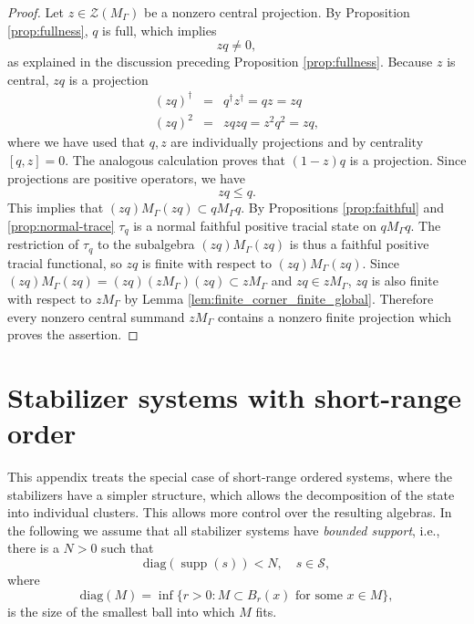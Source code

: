 \documentclass[aps,pra,reprint,superscriptaddress]{revtex4-2}
\newcommand{\cS}{{\mathcal S}}
\newcommand\G{\Gamma}
\renewcommand\t{\tau}
\theoremstyle{definition}
\theoremstyle{remark}
\begin{document}
\begin{proof}
Let $z\in\mathcal Z(M_\G)$ be a nonzero central projection.  By
Proposition \ref{prop:fullness}, $q$ is full, which implies
\begin{equation}
  zq\ne0,
\end{equation}
as explained in the discussion preceding Proposition \ref{prop:fullness}.
Because $z$ is central, $zq$ is a projection
\begin{eqnarray}
        (zq)^\dagger &=& q^\dagger z^\dagger = q z = z q\\
        (zq)^2 &=& zq zq = z^2 q^2 = zq,
\end{eqnarray}
where we have used that $q,z$ are individually projections and by centrality $[q,z]
= 0$. The analogous calculation proves that $(1-z)q$ is a projection. Since
projections are positive operators, we have
\begin{equation}
 zq\le q.   
\end{equation}
  This implies that $(zq) M_\G(zq) \subset qM_\G q$. By Propositions
  \ref{prop:faithful} and \ref{prop:normal-trace} $\t_q$ is a normal faithful positive tracial
  state on $q M_\G q$. The restriction of $\tau_q$ to the subalgebra
  $(zq) M_\G(zq)$ is thus a faithful positive tracial functional, so $zq$ is
  finite with respect to $(zq) M_\G (zq)$.
  Since $(zq) M_\G (zq) = (zq) (z M_\G) (zq) \subset z M_\G$ and $zq \in zM_\G$, $zq$ is also finite with respect to $z
  M_\G$ by Lemma \ref{lem:finite_corner_finite_global}.
  Therefore every nonzero central summand $z M_\G$ contains a nonzero
  finite projection which proves the assertion.
\end{proof}



\section{Stabilizer systems with short-range order}\label{app:short_range}
This appendix treats the special case of short-range ordered systems, where the stabilizers have a simpler structure,
which allows the decomposition of the state into individual clusters. This allows more control over the resulting algebras.
In the following we assume that all stabilizer systems have \emph{bounded
support}, i.e., there is a $N > 0$ such that 
\begin{equation}
    \mathrm{diag}(\operatorname{supp}(s)) < N,\quad s \in \cS,
\end{equation}
where 
\begin{equation}
    \mathrm{diag}(M) = \inf\{r>0 : M\subset B_r(x)\text{ for some }x\in M\},
\end{equation}
is the size of the smallest ball into which $M$ fits.
\end{document}
